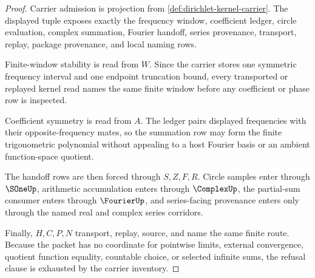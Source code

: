 \begin{proof}
Carrier admission is projection from \autoref{def:dirichlet-kernel-carrier}. The displayed tuple exposes exactly the frequency window, coefficient ledger, circle evaluation, complex summation, Fourier handoff, series provenance, transport, replay, package provenance, and local naming rows.

Finite-window stability is read from $W$. Since the carrier stores one symmetric frequency interval and one endpoint truncation bound, every transported or replayed kernel read names the same finite window before any coefficient or phase row is inspected.

Coefficient symmetry is read from $A$. The ledger pairs displayed frequencies with their opposite-frequency mates, so the summation row may form the finite trigonometric polynomial without appealing to a host Fourier basis or an ambient function-space quotient.

The handoff rows are then forced through $S,Z,F,R$. Circle samples enter through $\SOneUp$, arithmetic accumulation enters through $\ComplexUp$, the partial-sum consumer enters through $\FourierUp$, and series-facing provenance enters only through the named real and complex series corridors.

Finally, $H,C,P,N$ transport, replay, source, and name the same finite route. Because the packet has no coordinate for pointwise limits, external convergence, quotient function equality, countable choice, or selected infinite sums, the refusal clause is exhausted by the carrier inventory.
\end{proof}




